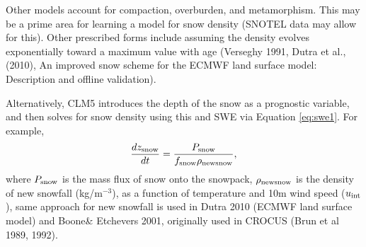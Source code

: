\documentclass[twoside,10pt]{report}
\begin{document}
Other models account for compaction, overburden, and metamorphism. This may be a prime area for learning a model for snow density (SNOTEL data may allow for this). Other prescribed forms include assuming the density evolves exponentially toward a maximum value with age (Verseghy 1991, Dutra et al., (2010), An improved snow scheme for the ECMWF land surface model: Description and offline validation).

Alternatively, CLM5 introduces the depth of the snow as a prognostic variable, and then solves for snow density using this and SWE via Equation \eqref{eq:swe1}. For example, 
\begin{equation}
\frac{d z_{\rm snow}}{d t} = \frac{P_{\rm snow}}{f_{\rm snow}\rho_{\rm newsnow}},
\end{equation}
where $P_{\rm snow}$ is the mass flux of snow onto the snowpack,  $\rho_{\rm newsnow}$ is the density of new snowfall (kg/m$^{-3}$), as a function of temperature and 10m wind speed ($u_{\rm int}$), same approach for new snowfall is used in Dutra 2010 (ECMWF land surface model) and Boone\& Etchevers 2001, originally used in CROCUS (Brun et al 1989, 1992).

 
 


\end{document}
